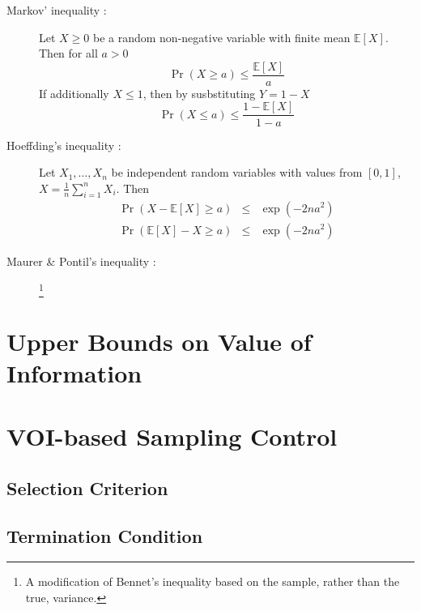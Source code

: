 \documentclass{article}
\newcommand {\IE} {\ensuremath {\mathbb{E}}}
\begin{document}
\begin{description}
\item[Markov' inequality \cite{}:] Let $X \ge 0$ be a random non-negative variable
  with finite mean $\IE[X]$. Then for all $a > 0$
\begin{equation}
\Pr(X\ge a)\le \frac {\IE[X]} a
\label{eq:conc-markov-upper}
\end{equation}
If additionally $X\le 1$, then by susbstituting $Y=1-X$
\begin{equation}
\Pr(X\le a)\le \frac {1-\IE[X]} {1-a}
\label{eq:conc-markov-lower}
\end{equation}
\item[Hoeffding's inequality \cite{}:] Let $X_1, \ldots, X_n$ be
independent random variables with values from $[0,1]$,
$X=\frac 1 n \sum_{i=1}^n X_i$. Then 
\begin{eqnarray}
\Pr(X-\IE[X] \ge a) &\le& \exp ( -2na^2)\nonumber\\
\Pr(\IE[X]-X \ge a) &\le& \exp ( -2na^2)
\label{eq:conc-hoeffding}
\end{eqnarray}
\item[Maurer \& Pontil's inequality \cite{MaurerPontil.benrstein}:] \footnote{A
  modification of Bennet's inequality \cite{} based on the sample,
  rather than the true, variance.}
\end{description}


\section{Upper Bounds on Value of Information}

\section{VOI-based Sampling Control}

\subsection{Selection Criterion}

\subsection{Termination Condition}



\end{document}
